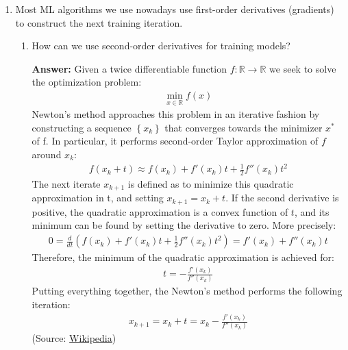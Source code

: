 \documentclass{article}
\newenvironment{QandA}{\begin{enumerate}[label=\arabic*.]}{\end{enumerate}}
\newenvironment{InnerQandA}{\begin{enumerate}[label=\roman*.]}{\end{enumerate}}
\newenvironment{answer}{\par\normalfont \textbf{Answer:}}{}
\newcommand{\R}{\mathbb{R}}
\begin{document}
\begin{QandA}
    \item Most ML algorithms we use nowadays use first-order derivatives (gradients) to construct the next training iteration.
    \begin{InnerQandA}
        \item How can we use second-order derivatives for training models?
        \begin{answer}
            Given a twice differentiable function $f: \R \rightarrow \R$ we seek to solve the optimization problem:
            \begin{align*}
                \min_{x \in \R} f(x)
            \end{align*}
            Newton's method approaches this problem in an iterative fashion by constructing a sequence $\left\{ x_k \right\}$ that converges towards the minimizer $x^{*}$ of f. In particular, it performs second-order Taylor approximation of $f$ around $x_k$:
            \begin{align*}
                f(x_k + t) \approx f(x_k) + f'(x_k)t + \frac{1}{2} f''(x_k)t^2
            \end{align*}
            The next iterate $x_{k+1}$ is defined as to minimize this quadratic approximation in t, and setting $x_{k+1} = x_k + t$. If the second derivative is positive, the quadratic approximation is a convex function of $t$, and its minimum can be found by setting the derivative to zero. More precisely:
            \begin{align*}
                0 = \frac{d}{dt} \left( f(x_k) + f'(x_k)t + \frac{1}{2} f''(x_k)t^2 \right) = f'(x_k) + f''(x_k)t
            \end{align*}
            Therefore, the minimum of the quadratic approximation is achieved for:
            \begin{align*}
                t = -\frac{f'(x_k)}{f''(x_k)}
            \end{align*}
            Putting everything together, the Newton's method performs the following iteration:
            \begin{align*}
                x_{k+1} = x_k + t = x_k -\frac{f'(x_k)}{f''(x_k)}
            \end{align*}
            (Source: \href{https://en.wikipedia.org/wiki/Newton%27s_method_in_optimization}{Wikipedia})
        \end{answer}


\end{InnerQandA}
\end{QandA}
\end{document}
